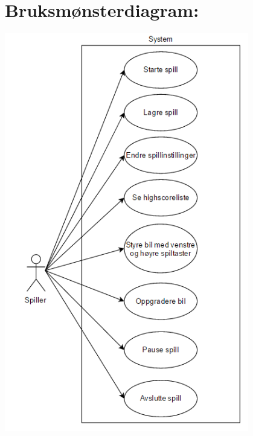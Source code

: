 \documentclass[12pt]{report}
\begin{document}
\section*{Bruksm{\o}nsterdiagram:}
\vspace{4cm}
\includegraphics[width=0.8\textwidth,natwidth=500,natheight=642]{use_case_diagram_b.png}
\end{document}
